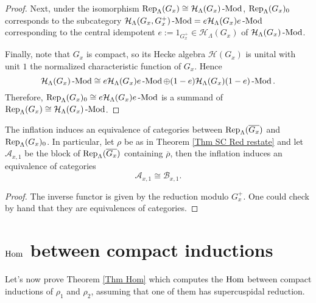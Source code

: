 \begin{proof}
			
			Next, under the isomorphism $\operatorname{\operatorname{Rep}}_{\Lambda}(G_x) \cong \mathcal{H}_{\Lambda}(G_x)\operatorname{-Mod}$, $\operatorname{\operatorname{Rep}}_{\Lambda}(G_x)_0$ corresponds to the subcategory  $\mathcal{H}_{\Lambda}(G_x, G_x^+)\operatorname{-Mod}=e\mathcal{H}_{\Lambda}(G_x)e\operatorname{-Mod}$ corresponding to the central idempotent $e:=1_{G_x^+} \in \mathcal{H}_{\Lambda}(G_x)$ of $\mathcal{H}_{\Lambda}(G_x)\operatorname{-Mod}$. 
			
			Finally, note that $G_x$ is compact, so its Hecke algebra $\mathcal{H}(G_x)$ is unital with unit $1$ the normalized characteristic function of $G_x$. Hence
			$$\mathcal{H}_{\Lambda}(G_x)\operatorname{-Mod} \cong e\mathcal{H}_{\Lambda}(G_x)e\operatorname{-Mod} \oplus (1-e)\mathcal{H}_{\Lambda}(G_x)(1-e)\operatorname{-Mod}.$$
			Therefore, $\operatorname{\operatorname{Rep}}_{\Lambda}(G_x)_0 \cong e\mathcal{H}_{\Lambda}(G_x)e\operatorname{-Mod}$ is a summand of $\operatorname{\operatorname{Rep}}_{\Lambda}(G_x) \cong \mathcal{H}_{\Lambda}(G_x)\operatorname{-Mod}$. 
		\end{proof}
		
		\begin{lemma}\label{Lemma A to B}
			The inflation induces an equivalence of categories between $\operatorname{\operatorname{Rep}}_{\Lambda}(\overline{G_x})$ and $\operatorname{\operatorname{Rep}}_{\Lambda}(G_x)_0$. In particular, let $\rho$ be as in Theorem \ref{Thm SC Red restate} and let $\mathcal{A}_{x,1}$ be the block of $\operatorname{\operatorname{Rep}}_{\Lambda}(\overline{G_x})$ containing $\overline{\rho}$, then the inflation induces an equivalence of categories 
			$$\mathcal{A}_{x,1} \cong \mathcal{B}_{x,1}.$$
		\end{lemma}
		
		\begin{proof}
			The inverse functor is given by the reduction modulo $G_x^+$. One could check by hand that they are equivalences of categories.
		\end{proof}
		
		
		
		
		
		
		
		
		
		
		\section{$\operatorname{\operatorname{Hom}}$ between compact inductions}\label{Sec Pf Thm Hom}
		
		Let's now prove Theorem \ref{Thm Hom} which computes the $\operatorname{\operatorname{Hom}}$ between compact inductions of $\rho_1$ and $\rho_2$, assuming that one of them has supercuspidal reduction.
		
